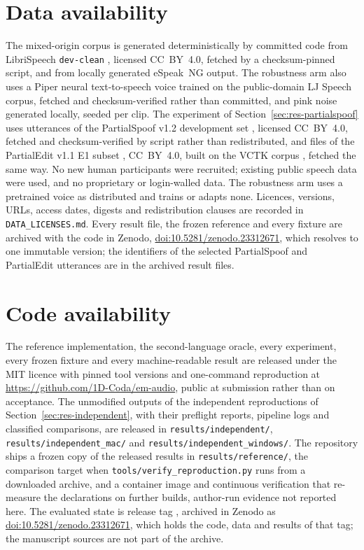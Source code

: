 \documentclass[preprint,3p,11pt,authoryear]{elsarticle}
\begin{document}
\section*{Data availability}

The mixed-origin corpus is generated deterministically by committed code from
LibriSpeech \texttt{dev-clean} \citep{panayotov2015librispeech}, licensed
CC~BY~4.0, fetched by a checksum-pinned script, and from locally generated
eSpeak~NG output. The robustness arm also uses a Piper neural
text-to-speech voice trained on the public-domain LJ Speech corpus, fetched and
checksum-verified rather than committed, and pink noise generated locally,
seeded per clip. The experiment of Section~\ref{sec:res-partialspoof} uses \Qclips{} utterances of the PartialSpoof
v1.2 development set \citep{zhang2021partialspoofdata}, licensed CC~BY~4.0,
fetched and checksum-verified by script rather than redistributed, and
\Rclips{} files of the PartialEdit v1.1 E1 subset
\citep{zhang2026partialeditdata}, CC~BY~4.0, built on the VCTK corpus
\citep{yamagishi2019vctk}, fetched the same way. No new human participants were recruited; existing public
speech data were used, and no proprietary or login-walled data. The robustness arm uses a pretrained
voice as distributed and trains or adapts none. Licences, versions, URLs, access dates, digests and redistribution clauses are
recorded in \texttt{DATA\_LICENSES.md}. Every result file, the frozen reference
and every fixture are archived with the code in Zenodo,
\href{https://doi.org/10.5281/zenodo.23312671}{\mbox{doi:10.5281/zenodo.23312671}}, which resolves to one immutable
version; the identifiers of the selected PartialSpoof and PartialEdit
utterances are in the archived result files.

\section*{Code availability}

The reference implementation, the second-language oracle, every experiment,
every frozen fixture and every machine-readable result are released under the
MIT licence with pinned tool versions and one-command reproduction at
\url{https://github.com/1D-Coda/em-audio}, public at submission rather than on
acceptance. The unmodified outputs of the independent reproductions of
Section~\ref{sec:res-independent}, with their preflight reports, pipeline logs
and classified comparisons, are released in \texttt{results/independent/},
\texttt{results/independent\_mac/} and \texttt{results/independent\_windows/}.
The repository ships a frozen copy of the released results in
\texttt{results/reference/}, the comparison target when
\texttt{tools/verify\_reproduction.py} runs from a downloaded archive, and a
container image and continuous verification that re-measure the declarations
on further builds, author-run evidence not reported here. The evaluated state is release tag \Rtag{}, archived in Zenodo as
\href{https://doi.org/10.5281/zenodo.23312671}{\mbox{doi:10.5281/zenodo.23312671}}, which holds the code, data and results of that tag; the manuscript sources
are not part of the archive.
\end{document}
